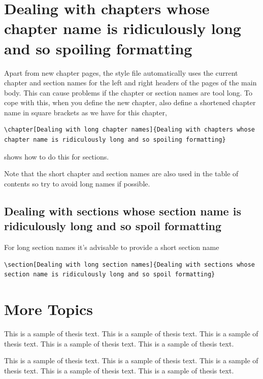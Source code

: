 \documentclass[12pt,oneside]{book} %
\begin{document}
\chapter[Dealing with long chapter names]{Dealing with chapters whose 
chapter name is ridiculously long and so spoiling formatting}
Apart from new chapter pages, the style file automatically uses the current chapter and section names for the left and right headers of the pages of the main body. This can cause problems if the chapter or section names are tool long. To cope with this, when you define the new chapter, also define a shortened chapter name in square brackets as we have for this chapter,
\begin{verbatim}
\chapter[Dealing with long chapter names]{Dealing with chapters whose 
chapter name is ridiculously long and so spoiling formatting}
\end{verbatim}
 shows how to do this for sections. 

Note that the short chapter and section names are also used in the table of contents so try to avoid long names if possible.

\newpage
\section[Dealing with long section names]{Dealing with sections whose 
section name is ridiculously long and so spoil formatting}
\label{sec:longSection}
For long section names it's advisable to provide a short section name
\begin{verbatim}
\section[Dealing with long section names]{Dealing with sections whose 
section name is ridiculously long and so spoil formatting}
\end{verbatim}


\chapter{More Topics}
This is a sample of thesis text. This is a sample of thesis text. This is a 
sample of thesis text. This is a sample of thesis text. This is a sample of
thesis text.

This is a sample of thesis text. This is a sample of thesis text. This is a 
sample of thesis text. This is a sample of thesis text. This is a sample of
thesis text.
\end{document}
